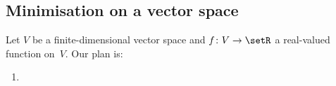 \documentclass[10pt, a4paper]{article}
\begin{document}



\subsection{Minimisation on a vector space}

Let $V$ be a finite-dimensional vector space and $f\colon V\to\setR$ a
real-valued function on~$V$. Our plan is:
\begin{enumerate}
\item 
\end{enumerate}
\end{document}
